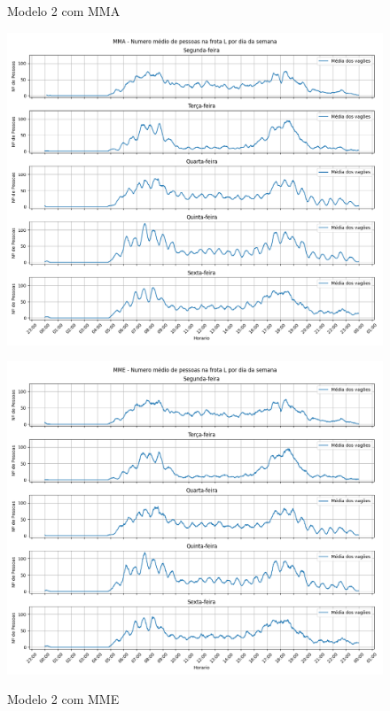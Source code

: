 \documentclass[acronym,symbols,table]{fei}
\begin{document}
\begin{figure}[!htb]
	\centering
	\begin{minipage}{0.5\textwidth}
		\caption{Modelo 2 com MMA}
		    \includegraphics[width=1\linewidth]{Imagens/MMA_-_Numero_medio_de_pessoas_na_frota_L_por_dia_da_semana.png}
    \label{fig:mmamodelo2}
	\end{minipage}\hfill
	\begin{minipage}{0.5\textwidth}
		\caption{Modelo 2 com MME}
		    \includegraphics[width=1\linewidth]{Imagens/MME_-_Numero_medio_de_pessoas_na_frota_L_por_dia_da_semana.png}
    \label{fig:mmemodelo2}
	\end{minipage}
\end{figure}
\end{document}
